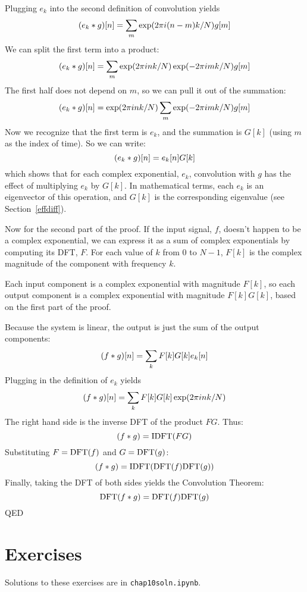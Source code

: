 Plugging $e_k$ into the second definition of convolution yields
%
\[ (e_k \ast g)[n] = \sum_m \exp(2 \pi i (n-m) k / N) g[m]  \]
%
We can split the first term into a product:
%
\[ (e_k \ast g)[n] = \sum_m \exp(2 \pi i n k / N) \exp(-2 \pi i m k / N) g[m]  \]
%
The first half does not depend on $m$, so we can pull it out of the
summation:
%
\[ (e_k \ast g)[n] = \exp(2 \pi i n k / N) \sum_m \exp(-2 \pi i m k / N) g[m]  \]
%
Now we recognize that the first term is $e_k$, and the summation is
$G[k]$ (using $m$ as the index of time).  So we can write:
%
\[ (e_k \ast g)[n] = e_k[n] G[k] \]
%
which shows that for each complex exponential, $e_k$, convolution
with $g$ has the effect of multiplying $e_k$ by $G[k]$.  In mathematical
terms, each $e_k$ is an eigenvector of this operation, and
$G[k]$ is the corresponding eigenvalue (see Section~\ref{effdiff}).

Now for the second part of the proof.  If the input signal, $f$, doesn't
happen to be a complex exponential, we can express it as a sum of
complex exponentials by computing its DFT, $F$.
For each value of $k$ from 0 to $N-1$, $F[k]$ is the complex
magnitude of the component with frequency $k$.

Each input component is a complex exponential with magnitude
$F[k]$, so each output component is a complex
exponential with magnitude $F[k] G[k]$, based on the first part of
the proof.

Because the system is linear, the output is just the sum of the
output components:
%
\[ (f \ast g)[n] = \sum_k F[k] G[k] e_k[n] \]
%
Plugging in the definition of $e_k$ yields
%
\[ (f \ast g)[n] = \sum_k F[k] G[k] \exp(2 \pi i n k / N) \]
%
The right hand side is the inverse DFT of the product $F G$.  Thus:
%
\[ (f \ast g) = \mathrm{IDFT}( F G ) \]
%
Substituting $F = \mathrm{DFT}(f)$ and $G = \mathrm{DFT}(g)$:
%
\[ (f \ast g) = \mathrm{IDFT}( \mathrm{DFT}(f) \mathrm{DFT}(g) ) \]
%
Finally, taking the DFT of both sides yields the Convolution Theorem:
%
\[ \mathrm{DFT}(f \ast g) = \mathrm{DFT}(f) \mathrm{DFT}(g) \]
%
QED


\section{Exercises}

Solutions to these exercises are in {\tt chap10soln.ipynb}.

